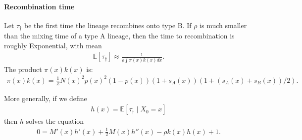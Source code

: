 \documentclass{article}
\newcommand{\E}{\mathbb{E}}
\newcommand{\given}{\;\vert\;}
\begin{document}
\paragraph{Recombination time}
Let $\tau_\dagger$ be the first time  the lineage recombines onto type B.
If $\rho$ is much smaller than the mixing time of a type A lineage,
then the time to recombination is roughly Exponential,
with mean
\begin{align}
    \E[\tau_\dagger] \approx \frac{1}{ \rho \int \pi(x) k(x) dx } .
\end{align}
The product $\pi(x) k(x)$ is:
\begin{align}
    \pi(x) k(x) = \frac{1}{Z} N(x)^2 p(x)^2 (1-p(x)) (1+s_A(x)) (1+(s_A(x)+s_B(x))/2) .
\end{align}

More generally, if we define
\begin{align}
    h(x) = \E[\tau_\dagger \given X_0 = x]
\end{align}
then $h$ solves the equation
\begin{align}
    0 = M'(x) h'(x) + \frac{1}{2} M(x) h''(x) - \rho k(x) h(x) + 1 .
\end{align}
\end{document}
